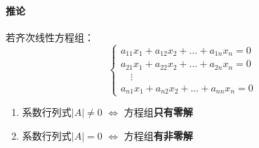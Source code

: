 \documentclass[a4paper,12pt]{article}
\begin{document}
    \paragraph{推论} 若齐次线性方程组：
    \[
        \begin{cases}
            a_{11}x_1 + a_{12}x_2 + \dots + a_{1n}x_n = 0 \\
            a_{21}x_1 + a_{22}x_2 + \dots + a_{2n}x_n = 0 \\
            \quad \vdots \\
            a_{n1}x_1 + a_{n2}x_2 + \dots + a_{nn}x_n = 0
        \end{cases}
    \]

    \begin{enumerate}
        \item 系数行列式$|A| \neq 0$ $\Leftrightarrow$ 方程组\textbf{只有零解}
        \item 系数行列式$|A| = 0$ $\Leftrightarrow$ 方程组\textbf{有非零解}
    \end{enumerate}
\end{document}
